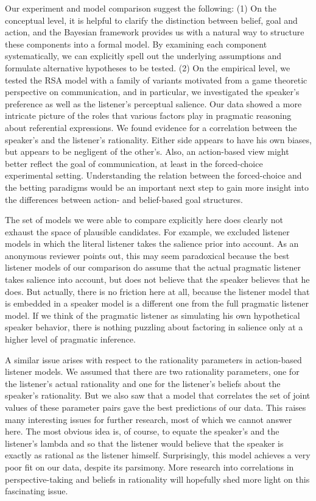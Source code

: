 Our experiment and model comparison suggest the following: (1) On the
conceptual level, it is helpful to clarify the distinction between
belief, goal and action, and the Bayesian framework provides us with a
natural way to structure these components into a formal model. By
examining each component systematically, we can explicitly spell out
the underlying assumptions and formulate alternative hypotheses to be
tested. (2) On the empirical level, we tested the RSA model with a
family of variants motivated from a game theoretic perspective on
communication, and in particular, we investigated the speaker's
preference as well as the listener's perceptual salience. Our data
showed a more intricate picture of the roles that various factors play
in pragmatic reasoning about referential expressions. We found
evidence for a correlation between the speaker's and the listener's
rationality. Either side appears to have his own biases, but appears
to be negligent of the other's. Also, an action-based view might
better reflect the goal of communication, at least in the
forced-choice experimental setting. Understanding the relation between
the forced-choice and the betting paradigms would be an important next
step to gain more insight into the differences between action- and
belief-based goal structures.

The set of models we were able to compare explicitly here does clearly
not exhaust the space of plausible candidates. For example, we
excluded listener models in which the literal listener takes the
salience prior into account. As an anonymous reviewer points out, this
may seem paradoxical because the best listener models of our
comparison do assume that the actual pragmatic listener takes salience
into account, but does not believe that the speaker believes that he
does. But actually, there is no friction here at all, because the
listener model that is embedded in a speaker model is a different one
from the full pragmatic listener model. If we think of the pragmatic
listener as simulating his own hypothetical speaker behavior, there is
nothing puzzling about factoring in salience only at a higher level of
pragmatic inference.

A similar issue arises with respect to the rationality parameters in
action-based listener models. We assumed that there are two
rationality parameters, one for the listener's actual rationality and
one for the listener's beliefs about the speaker's rationality. But we
also saw that a model that correlates the set of joint values of these
parameter pairs gave the best predictions of our data. This raises
many interesting issues for further research, most of which we cannot
answer here. The most obvious idea is, of course, to equate the
speaker's and the listener's lambda and so that the listener would
believe that the speaker is exactly as rational as the listener
himself. Surprisingly, this model achieves a very poor fit on our
data, despite its parsimony. More research into correlations in
perspective-taking and beliefs in rationality will hopefully shed more
light on this fascinating issue.

